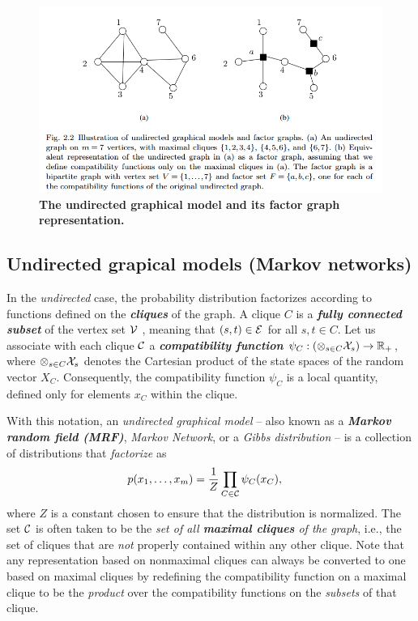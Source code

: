 \documentclass[11pt]{article}
\begin{document}
\begin{figure}
\begin{minipage}[t]{1\linewidth}
  \centering
  \centerline{\includegraphics[scale = 0.45]{factor_graph.png}}
\end{minipage}
\caption{\footnotesize{\textbf{The undirected graphical model and its factor graph representation.}}}
\label{fig: factor_graph}
\end{figure}

\subsection{Undirected grapical models (Markov networks)}
In the \emph{undirected} case, the probability distribution factorizes according to functions defined on the \emph{\textbf{cliques}} of the graph. A clique $C$ is a \emph{\textbf{fully connected subset}} of the vertex set ${\mathcal V}$ , meaning that $(s,t) \in {\mathcal E}$ for all $s,t \in C$.
Let us associate with each clique ${\mathcal C}$ a \emph{\textbf{compatibility function}} $\psi_{C}: (\otimes_{s\in C}{\mathcal X}_{s}) \rightarrow {\mathbb R}_{+}$, where $\otimes_{s\in C}{\mathcal X}_{s}$ denotes the Cartesian product of the state spaces of the random vector $X_{C}$.  Consequently, the compatibility function $\psi_{C}$ is a local quantity, defined only for elements $x_C$ within the clique.

With this notation, an \emph{undirected graphical model} -- also known as a \emph{\textbf{Markov random field (MRF)}}, \emph{Markov Network}, or a \emph{Gibbs distribution} -- is a collection of distributions that \emph{factorize} as
\begin{align}
p(x_1, \ldots, x_{m}) &= \frac{1}{Z}\prod_{C \in {\mathcal C}}\psi_{C}(x_{C}),\label{eqn: mrf_graph_factorization}
\end{align} where $Z$ is a constant chosen to ensure that the distribution is normalized. The set ${\mathcal C}$ is often taken to be the \emph{set of all \textbf{maximal cliques} of the graph}, i.e., the set of cliques that are \emph{not} properly contained within any other clique. Note that any representation based on nonmaximal cliques can always be converted to one based on maximal cliques by redefining the compatibility function on a maximal clique to be the \emph{product} over the compatibility functions on the \emph{subsets} of that clique.
\end{document}
